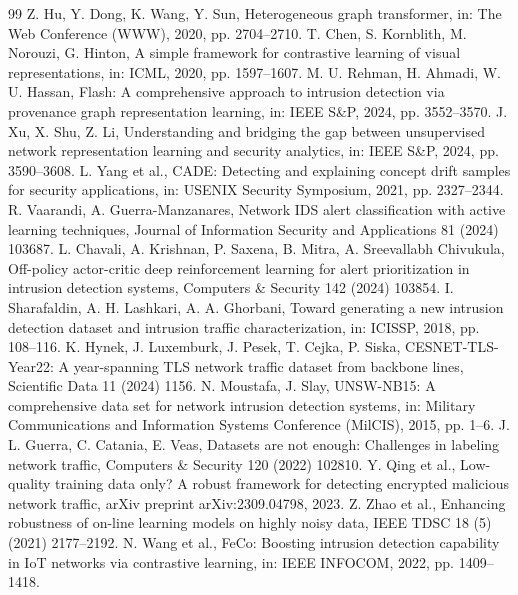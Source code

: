 \documentclass[preprint,3p,times]{elsarticle}
\begin{document}
\begin{thebibliography}{99}
 Z. Hu, Y. Dong, K. Wang, Y. Sun, Heterogeneous graph
transformer, in: The Web Conference (WWW), 2020, pp. 2704--2710.
 T. Chen, S. Kornblith, M. Norouzi, G. Hinton, A simple
framework for contrastive learning of visual representations, in: ICML, 2020,
pp. 1597--1607.
 M. U. Rehman, H. Ahmadi, W. U. Hassan, Flash: A
comprehensive approach to intrusion detection via provenance graph representation
learning, in: IEEE S\&P, 2024, pp. 3552--3570.
 J. Xu, X. Shu, Z. Li, Understanding and bridging the gap
between unsupervised network representation learning and security analytics, in:
IEEE S\&P, 2024, pp. 3590--3608.
 L. Yang et al., CADE: Detecting and explaining concept
drift samples for security applications, in: USENIX Security Symposium, 2021,
pp. 2327--2344.
 R. Vaarandi, A. Guerra-Manzanares, Network IDS alert
classification with active learning techniques, Journal of Information Security
and Applications 81 (2024) 103687.
 L. Chavali, A. Krishnan, P. Saxena, B. Mitra,
A. Sreevallabh Chivukula, Off-policy actor-critic deep reinforcement learning for
alert prioritization in intrusion detection systems, Computers \& Security 142
(2024) 103854.
 I. Sharafaldin, A. H. Lashkari, A. A. Ghorbani,
Toward generating a new intrusion detection dataset and intrusion traffic
characterization, in: ICISSP, 2018, pp. 108--116.
 K. Hynek, J. Luxemburk, J. Pesek, T. Cejka, P. Siska,
CESNET-TLS-Year22: A year-spanning TLS network traffic dataset from backbone
lines, Scientific Data 11 (2024) 1156.
 N. Moustafa, J. Slay, UNSW-NB15: A comprehensive data
set for network intrusion detection systems, in: Military Communications and
Information Systems Conference (MilCIS), 2015, pp. 1--6.
 J. L. Guerra, C. Catania, E. Veas, Datasets are not
enough: Challenges in labeling network traffic, Computers \& Security 120
(2022) 102810.
 Y. Qing et al., Low-quality training data only? A
robust framework for detecting encrypted malicious network traffic, arXiv
preprint arXiv:2309.04798, 2023.
 Z. Zhao et al., Enhancing robustness of on-line
learning models on highly noisy data, IEEE TDSC 18 (5) (2021) 2177--2192.
 N. Wang et al., FeCo: Boosting intrusion detection
capability in IoT networks via contrastive learning, in: IEEE INFOCOM, 2022,
pp. 1409--1418.

\end{thebibliography}
\end{document}

